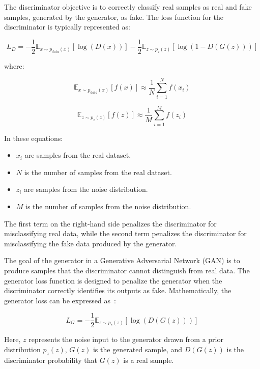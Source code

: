 \documentclass[12pt,a4paper]{report}
\begin{document}
The discriminator objective is to correctly classify real samples as real and fake samples, generated by the generator, as fake. The loss function for the discriminator is typically represented as:

\begin{equation}
  L_D = - \frac{1}{2} \mathbb{E}_{x \sim p_{data}(x)} [\log(D(x))] - \frac{1}{2} \mathbb{E}_{z \sim p_z(z)} [\log(1 - D(G(z)))]
\end{equation}

where:

\begin{equation}
  \mathbb{E}_{x \sim p_{data}(x)} [f(x)] \approx \frac{1}{N} \sum_{i=1}^{N} f(x_i)
\end{equation}

\begin{equation}
  \mathbb{E}_{z \sim p_z(z)} [f(z)] \approx \frac{1}{M} \sum_{i=1}^{M} f(z_i)
\end{equation}

In these equations:
\begin{itemize}
  \item \( x_i \) are samples from the real dataset.
  \item \( N \) is the number of samples from the real dataset.
  \item \( z_i \) are samples from the noise distribution.
  \item \( M \) is the number of samples from the noise distribution.
\end{itemize}

The first term on the right-hand side penalizes the discriminator for misclassifying real data, while the second term penalizes the discriminator for misclassifying the fake data produced by the generator.

The goal of the generator in a Generative Adversarial Network (GAN) is to produce samples that the discriminator cannot distinguish from real data. The generator loss function is designed to penalize the generator when the discriminator correctly identifies its outputs as fake. Mathematically, the generator loss can be expressed as~\cite{gan}:

\begin{equation}
  L_G = -\frac{1}{2} \mathbb{E}_{z \sim p_z(z)} \left[ \log(D(G(z))) \right]
\end{equation}

Here, \( z \) represents the noise input to the generator drawn from a prior distribution \( p_z(z) \), \( G(z) \) is the generated sample, and \( D(G(z)) \) is the discriminator probability that \( G(z) \) is a real sample.
\end{document}
